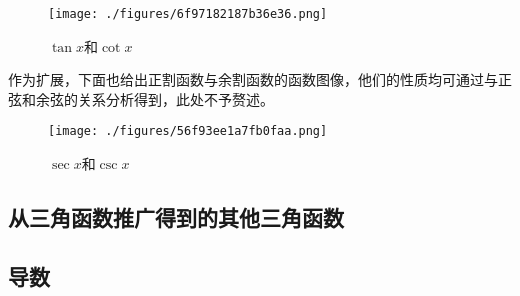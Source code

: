 \begin{figure}[ht]
\centering
\texttt{[image: ./figures/6f97182187b36e36.png]}
\caption{$\tan x$和$\cot x$} \label{fig_HsTFFv_3}
\end{figure}

作为扩展，下面也给出正割函数与余割函数的函数图像，他们的性质均可通过与正弦和余弦的关系分析得到，此处不予赘述。

\begin{figure}[ht]
\centering
\texttt{[image: ./figures/56f93ee1a7fb0faa.png]}
\caption{$\sec x$和$\csc x$} \label{fig_HsTFFv_2}
\end{figure}

\subsection{从三角函数推广得到的其他三角函数}

\subsection{导数}